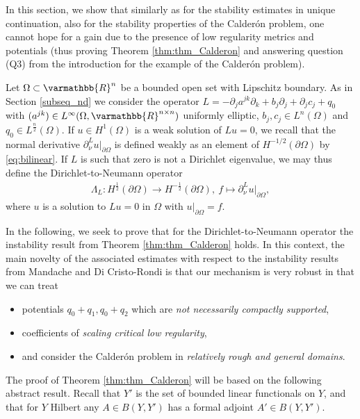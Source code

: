 \documentclass[12pt,twoside]{amsart}
\numberwithin{equation}{section}
\renewcommand{\mathbb}{\varmathbb}
\newcommand {\R} {\mathbb{R}} \newcommand {\Z} {\mathbb{Z}}
\newcommand {\p} {\partial}
\newcommand{\mR}{\mathbb{R}}                    %
\begin{document}
In this section, we show that similarly as for the stability estimates in unique continuation, also for the stability properties of the Calder\'on problem, one cannot hope for a gain due to the presence of low regularity metrics and potentials (thus proving Theorem \ref{thm:thm_Calderon} and answering question (Q3) from the introduction for the example of the Calder\'on problem). 

Let $\Omega \subset \mR^n$ be a bounded open set with Lipschitz boundary. As in Section \ref{subseq_nd} we consider the operator $L = - \p_j a^{jk} \p_k + b_j \p_j + \p_j c_j + q_0$ with $(a^{jk}) \in L^{\infty}(\Omega, \R^{n\times n})$ uniformly elliptic, $b_j, c_j \in L^{n}(\Omega)$ and $q_0 \in L^{\frac{n}{2}}(\Omega)$. If $u \in H^1(\Omega)$ is a weak solution of $Lu = 0$, we recall that the normal derivative $\p_{\nu}^L u|_{\p \Omega}$ is defined weakly as an element of $H^{-1/2}(\p \Omega)$ by \eqref{eq:bilinear}. If $L$ is such that zero is not a Dirichlet eigenvalue, we may thus define the Dirichlet-to-Neumann operator
\begin{align}
\label{eq:DtN_Calderon}
\Lambda_{L}: H^{\frac{1}{2}}(\partial \Omega) \rightarrow H^{-\frac{1}{2}}(\partial \Omega), \ f\mapsto \p_{\nu}^L u|_{\partial \Omega},
\end{align}
 where $u$ is a solution to $L u = 0$ in $\Omega$ with $u|_{\partial \Omega} = f$.
 
In the following, we seek to prove that for the Dirichlet-to-Neumann operator the instability result from Theorem \ref{thm:thm_Calderon} holds. In this context, the main novelty of the associated estimates with respect to the instability results from Mandache \cite{Mandache} and Di Cristo-Rondi \cite{DiCristoRondi} is that our mechanism is very robust in that we can treat
\begin{itemize} 
\item potentials $q_0+q_1, q_0+ q_2$ which are \emph{not necessarily compactly supported},
\item coefficients of \emph{scaling critical low regularity}, 
\item and consider the Calder\'on problem in \emph{relatively rough and general domains}.
\end{itemize}


The proof of Theorem \ref{thm:thm_Calderon} will be based on the following abstract result. Recall that $Y'$ is the set of bounded linear functionals on $Y$, and that for $Y$ Hilbert any $A \in B(Y, Y')$ has a formal adjoint $A' \in B(Y, Y')$.
\end{document}
